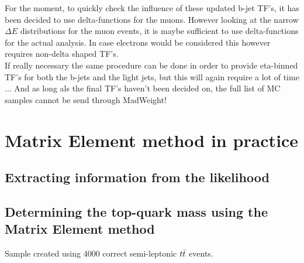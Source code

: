 For the moment, to quickly check the influence of these updated b-jet TF's, it has been decided to use delta-functions for the muons. However looking at the narrow $\Delta E$ distributions for the muon events, it is maybe sufficient to use delta-functions for the actual analysis.
In case electrons would be considered this however requires non-delta shaped TF's.\\
If really necessary the same procedure can be done in order to provide eta-binned TF's for both the b-jets and the light jets, but this will again require a lot of time ... And as long als the final TF's haven't been decided on, the full list of MC samples cannot be send through MadWeight!

\section{Matrix Element method in practice}
\subsection{Extracting information from the likelihood}
\subsection{Determining the top-quark mass using the Matrix Element method}
Sample created using 4000 correct semi-leptonic $t\bar{t}$ events.
